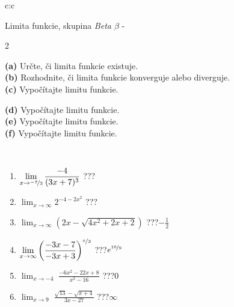 \documentclass[10pt]{report}
\begin{document}
\begin{tabular}{c:c}
\begin{minipage}[c][104.5mm][t]{0.5\linewidth}
\begin{center}
\vspace{7mm}
{\huge Limita funkcie, skupina \textit{Beta $\beta$} -}\\[5mm]
\begin{minipage}{0.95\linewidth}
\begin{center}
{\small \begin{multicols}{2} \raggedright
\textbf{(a)} Určte, či limita funkcie existuje. \\[1mm]
\textbf{(b)} Rozhodnite, či limita funkcie konverguje alebo diverguje. \\[1mm]
\textbf{(c)} Vypočítajte limitu funkcie. \par \columnbreak
\textbf{(d)} Vypočítajte limitu funkcie. \\[1mm]
\textbf{(e)} Vypočítajte limitu funkcie. \\[1mm]
\textbf{(f)} Vypočítajte limitu funkcie. \\[1mm]
\end{multicols}
}
\end{center}
\end{minipage}
\\[4mm]
\begin{minipage}{0.79\linewidth}
\begin{center}
\begin{varwidth}{\linewidth}
\begin{enumerate}
\normalsize
\item $\displaystyle\lim_{x\to\nicefrac{-7}{3}}{\frac{-4}{(3x+7)^{3}}}$\quad \dotfill\; ???\;\dotfill \quad {}
\item $\displaystyle\lim_{x\to\infty}{2^{-4-2x^2}}$\quad \dotfill\; ???\;\dotfill \quad {}
\item $\displaystyle\lim_{x\to\infty}{\left(2x - \sqrt{4x^2+2x+2}\right)}$\quad \dotfill\; ???\;\dotfill \quad $-\frac{1}{2}$
\item $\displaystyle\lim_{x\to\infty}{\left( \frac{-3x-7}{-3x+3} \right)^{\nicefrac{x}{3}}}$\quad \dotfill\; ???\;\dotfill \quad $e^{\nicefrac{10}{9}}$
\item $\displaystyle\lim_{x\to -4}{\;\frac{-6x^2-22x+8}{x^2-16}}$\quad \dotfill\; ???\;\dotfill \quad $0$
\item $\displaystyle\lim_{x\to 9}{\;\frac{\sqrt{13}-\sqrt{x+4}}{3x-27}}$\quad \dotfill\; ???\;\dotfill \quad $\infty$

\end{enumerate}
\end{varwidth}
\end{center}
\end{minipage}
\end{center}
\end{minipage}
\end{tabular}
\end{document}
